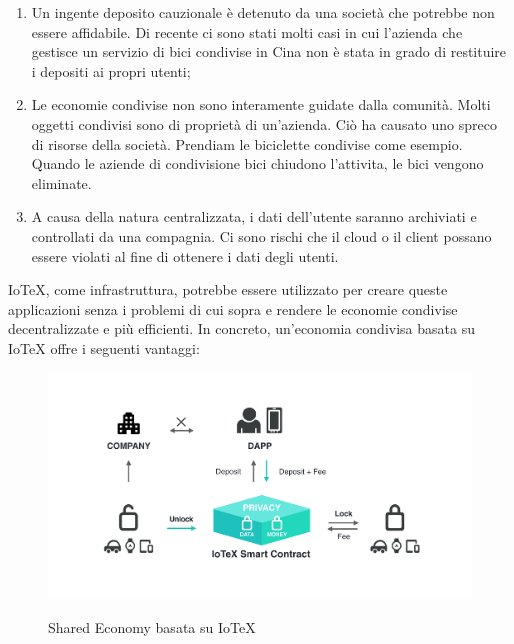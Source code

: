 \begin{enumerate}
    \item Un ingente deposito cauzionale è detenuto da una società che potrebbe non essere affidabile. Di recente ci sono stati molti casi in cui l'azienda che gestisce un servizio di bici condivise in Cina non è stata in grado di restituire i depositi ai propri utenti;

    \item Le economie condivise non sono interamente guidate dalla comunità. Molti oggetti condivisi sono di proprietà di un'azienda. Ciò ha causato uno spreco di risorse della società. Prendiam le biciclette condivise come esempio. Quando le aziende di condivisione bici chiudono l'attivita, le bici vengono eliminate.

    \item A causa della natura centralizzata, i dati dell'utente saranno archiviati e controllati da una compagnia. Ci sono rischi che il cloud o il client possano essere violati al fine di ottenere i dati degli utenti.
\end{enumerate}

IoTeX, come infrastruttura, potrebbe essere utilizzato per creare queste applicazioni senza i problemi di cui sopra e rendere le economie condivise decentralizzate e più efficienti. In concreto, un'economia condivisa basata su IoTeX offre i seguenti vantaggi:

\begin{figure}[ht]
    \centering
    \includegraphics[width=\textwidth]{Figura7}
    \label{fig:Figura7}
    \caption{Shared Economy basata su IoTeX}
\end{figure}

